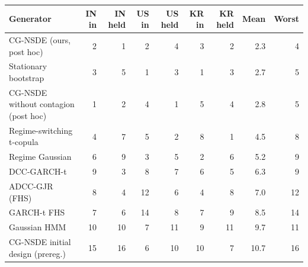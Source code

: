 \begin{tabular}{lrrrrrrrr}
\toprule
Generator & IN in & IN held & US in & US held & KR in & KR held & Mean & Worst \\
\midrule
CG-NSDE (ours, post hoc) & 2 & 1 & 2 & 4 & 3 & 2 & 2.3 & 4 \\
Stationary bootstrap & 3 & 5 & 1 & 3 & 1 & 3 & 2.7 & 5 \\
CG-NSDE without contagion (post hoc) & 1 & 2 & 4 & 1 & 5 & 4 & 2.8 & 5 \\
Regime-switching t-copula & 4 & 7 & 5 & 2 & 8 & 1 & 4.5 & 8 \\
Regime Gaussian & 6 & 9 & 3 & 5 & 2 & 6 & 5.2 & 9 \\
DCC-GARCH-t & 9 & 3 & 8 & 7 & 6 & 5 & 6.3 & 9 \\
ADCC-GJR (FHS) & 8 & 4 & 12 & 6 & 4 & 8 & 7.0 & 12 \\
GARCH-t FHS & 7 & 6 & 14 & 8 & 7 & 9 & 8.5 & 14 \\
Gaussian HMM & 10 & 10 & 7 & 11 & 9 & 11 & 9.7 & 11 \\
CG-NSDE initial design (prereg.) & 15 & 16 & 6 & 10 & 10 & 7 & 10.7 & 16 \\
\bottomrule
\end{tabular}
